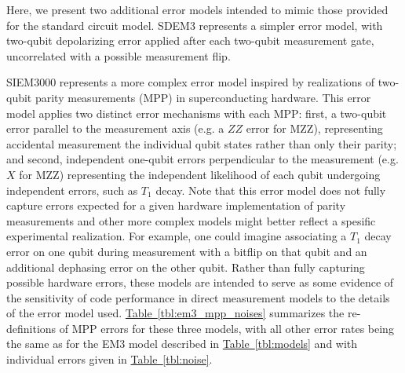 \documentclass[onecolumn,a4paper,accepted=2022-09-12]{quantumarticle}
\theoremstyle{definition}
\theoremstyle{definition}
\theoremstyle{definition}
\newcommand{\tbl}[1]{\hyperref[tbl:#1]{Table~\ref*{tbl:#1}}}
\begin{document}
Here, we present two additional error models intended to mimic those provided for the standard circuit model. 
SDEM3 represents a simpler error model, with two-qubit depolarizing error applied after each two-qubit measurement gate, uncorrelated with a possible measurement flip.

SIEM3000 represents a more complex error model inspired by realizations of two-qubit parity measurements (MPP) in superconducting hardware. This error model applies two distinct error mechanisms with each MPP: first, a two-qubit error parallel to the measurement axis (e.g. a $ZZ$ error for MZZ), representing accidental measurement the individual qubit states rather than only their parity; and second, independent one-qubit errors perpendicular to the measurement (e.g. $X$ for MZZ) representing the independent likelihood of each qubit undergoing independent errors, such as $T_1$ decay. Note that this error model does not fully capture errors expected for a given hardware implementation of parity measurements and other more complex models might better reflect a spesific experimental realization. For example, one could imagine associating a $T_1$ decay error on one qubit during measurement with a bitflip on that qubit and an additional dephasing error on the other qubit. Rather than fully capturing possible hardware errors, these models are intended to serve as some evidence of the sensitivity of code performance in direct measurement models to the details of the error model used. \tbl{em3_mpp_noises} summarizes the re-definitions of MPP errors for these three models, with all other error rates being the same as for the EM3 model described in \tbl{models} and with individual errors given in \tbl{noise}. 
\end{document}
